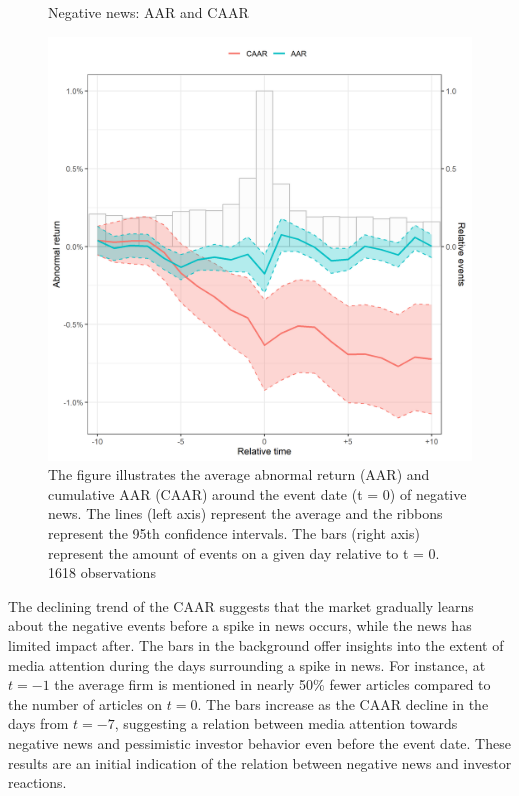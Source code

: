 \begin{figure} [H]
    \centering
    \caption{Negative news: AAR and CAAR}
    \includegraphics[scale=0.6]{Projekt/1.Figures analysis/ST_negative_all_CI.png}
     \caption*{\footnotesize The figure illustrates the average abnormal return (AAR) and cumulative AAR (CAAR) around the event date (t = 0) of negative news. The lines (left axis) represent the average and the ribbons represent the 95th confidence intervals. The bars (right axis) represent the amount of events on a given day relative to t = 0. 1618 observations }
    \label{fig:ST_neg_news}
\end{figure} 

 
The declining trend of the CAAR suggests that the market gradually learns about the negative events before a spike in news occurs, while the news has limited impact after. The bars in the background offer insights into the extent of media attention during the days surrounding a spike in news. For instance, at $t = -1$ the average firm is mentioned in nearly 50\% fewer articles compared to the number of articles on $t = 0$. The bars increase as the CAAR decline in the days from $t=-7$, suggesting a relation between media attention towards negative news and pessimistic investor behavior even before the event date. These results are an initial indication of the relation between negative news and investor reactions.  

